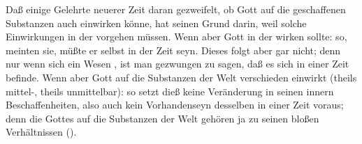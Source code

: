 \begin{aufza}
\begin{aufzb}
\item Daß einige Gelehrte neuerer Zeit daran gezweifelt, ob Gott auf die geschaffenen Substanzen auch  einwirken könne, hat seinen Grund darin, weil solche Einwirkungen in der  vorgehen müssen. Wenn aber Gott in der  wirken sollte: so, meinten sie, müßte er selbst in der Zeit seyn. Dieses folgt aber gar nicht; denn nur wenn sich ein Wesen , ist man gezwungen zu sagen, daß es sich in einer Zeit befinde. Wenn aber Gott auf die Substanzen der Welt verschieden einwirkt (theils mittel-, theils unmittelbar): so setzt dieß keine Veränderung in seinen innern Beschaffenheiten, also auch kein Vorhandenseyn desselben in einer Zeit voraus; denn die  Gottes auf die Substanzen der Welt gehören ja zu seinen bloßen Verhältnissen ().~
\end{aufzb}
\end{aufza}

